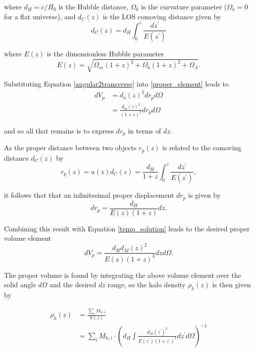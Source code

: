 \documentclass[%
 reprint,
 amsmath,amssymb,
 aps,nofootinbib
]{revtex4-1}
\begin{document}
\noindent where $d_H=c/H_0$ is the Hubble distance, $\Omega_k$ is the curvature parameter ($\Omega_k=0$ for a flat universe), and $d_C(z)$ is the LOS comoving distance given by
\begin{equation}\label{comoving_distance}
d_C(z)=d_H\int_0^z\frac{dz^\prime}{E(z^\prime)}
\end{equation}

\noindent where $E(z)$ is the dimensionless Hubble parameter
\begin{equation}\label{dim_hubble_parameter}
E(z)=\sqrt{\Omega_m(1+z)^3+\Omega_k(1+z)^2+\Omega_\Lambda}.
\end{equation}

\noindent Substituting Equation \eqref{angular2transverse} into \eqref{proper_element} leads to
\begin{align}\label{temp_solution}
dV_p&=d_a(z)^2dr_pd\Omega\nonumber\\
&=\frac{d_m(z)^2}{(1+z)^2}dr_pd\Omega
\end{align}

\noindent and so all that remains is to express $dr_p$ in terms of $dz$.

As the proper distance between two objects $r_p(z)$ is related to the comoving distance $d_C(z)$ by
\begin{equation}\label{physical2comoving}
r_p(z)=a(z)d_C(z)=\frac{d_H}{1+z}\int_0^z\frac{dz^\prime}{E(z^\prime)},
\end{equation}

\noindent it follows that that an infinitesimal proper displacement $dr_p$ is given by
\begin{equation}\label{physical2comoving_inf}
dr_p=\frac{d_H}{E(z)(1+z)}dz.
\end{equation}

\noindent Combining this result with Equation \eqref{temp_solution} leads to the desired proper volume element
\begin{equation}\label{pvolume_element}
dV_p=\frac{d_Hd_M(z)^2}{E(z)(1+z)^3}dzd\Omega.
\end{equation}

The proper volume is found by integrating the above volume element over the solid angle $d\Omega$ and the desired $dz$ range, so the halo density $\rho_h(z)$ is then given by

\begin{align}\label{rho_h}
\rho_h(z)&=\frac{\sum_i M_{h,i}}{V(z)}\nonumber\\
&=\sum_i M_{h,i}\cdot\left(d_H\int\frac{d_M(z^\prime)^2}{E(z^\prime)(1+z^\prime)^3}dz^\prime d\Omega\right)^{-1}
\end{align}
\end{document}
